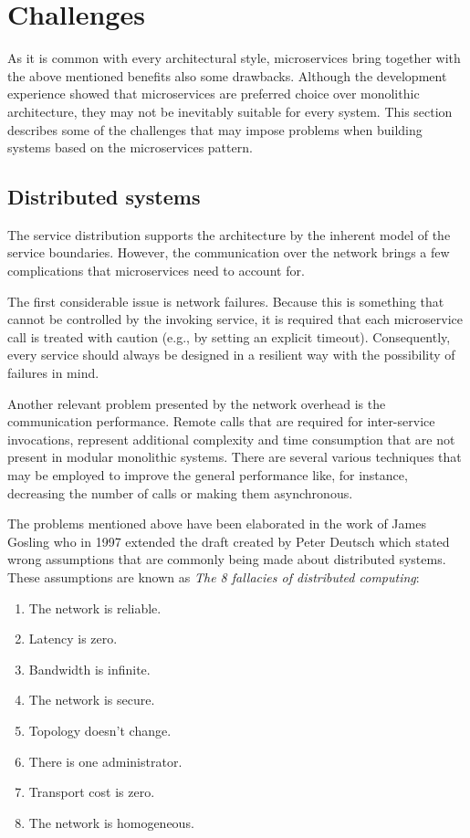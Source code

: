 \documentclass[oneside,
  digital, %
  table,   %
  lof,     %
  lot,     %
]{fithesis3}
\begin{document}
\section{Challenges}

As it is common with every architectural style, microservices bring together with the above mentioned benefits also some drawbacks. Although the development experience showed that microservices are preferred choice over monolithic architecture, they may not be inevitably suitable for every system. This section describes some of the challenges that may impose problems when building systems based on the microservices pattern.

\subsection{Distributed systems}

The service distribution supports the architecture by the inherent model of the service boundaries. However, the communication over the network brings a few complications that microservices need to account for.

The first considerable issue is network failures. Because this is something that cannot be controlled by the invoking service, it is required that each microservice call is treated with caution (e.g., by setting an explicit timeout). Consequently, every service should always be designed in a resilient way with the possibility of failures in mind. 

Another relevant problem presented by the network overhead is the communication performance. Remote calls that are required for inter-service invocations, represent additional complexity and time consumption that are not present in modular monolithic systems. There are several various techniques that may be employed to improve the general performance like, for instance, decreasing the number of calls or making them asynchronous.

The problems mentioned above have been elaborated in the work of James Gosling who in 1997 extended the draft created by Peter Deutsch which stated wrong assumptions that are commonly being made about distributed systems. These assumptions are known as \textit{The 8 fallacies of distributed computing}:

\begin{enumerate}
    \item The network is reliable.
    \item Latency is zero.
    \item Bandwidth is infinite.
    \item The network is secure.
    \item Topology doesn't change.
    \item There is one administrator.
    \item Transport cost is zero.
    \item The network is homogeneous.
\end{enumerate}
\end{document}
